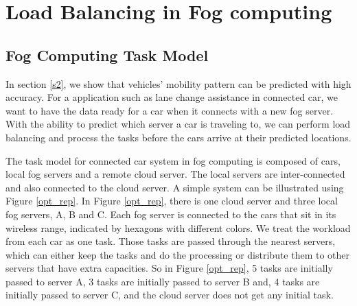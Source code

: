 \section{Load Balancing in Fog computing}
\label{s3}

\subsection{Fog Computing Task Model}
\label{Fog Computing Task Model}



In section \ref{s2}, we show that vehicles' mobility pattern can be predicted with high accuracy. For a application such as lane change assistance in connected car, we want to have the data ready for a car when it connects with a new fog server. With the ability to predict which server a car is traveling to, we can perform load balancing and process the tasks before the cars arrive at their predicted locations. 

The task model for connected car system in fog computing is composed of cars, local fog servers and a remote cloud server. The local servers are inter-connected and also connected to the cloud server. A simple system can be illustrated using Figure \ref{opt_rep}. In Figure \ref{opt_rep}, there is one cloud server and three local fog servers, A, B and C. Each fog server is connected to the cars that sit in its wireless range, indicated by hexagons with different colors. We treat the workload from each car as one task. Those tasks are passed through the nearest servers, which can either keep the tasks and do the processing or distribute them to other servers that have extra capacities. So in Figure \ref{opt_rep}, 5 tasks are initially passed to server A, 3 tasks are initially passed to server B and, 4 tasks are initially passed to server C, and the cloud server does not get any initial task.


